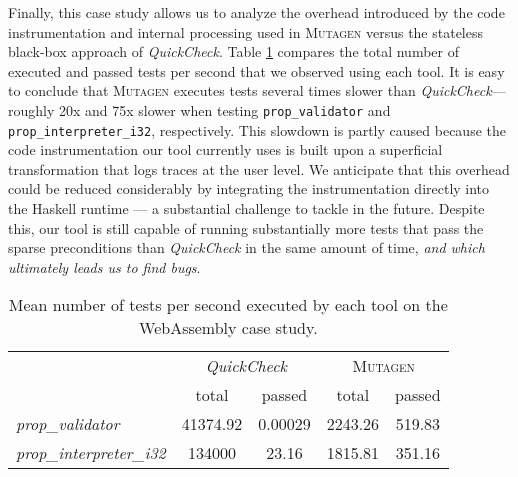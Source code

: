 \documentclass[sigconf, anonymous, review]{acmart}
\newcommand{\quickcheck}{\textit{QuickCheck}\xspace}
\newcommand{\mutagen}{\textsc{Mutagen}\xspace}
\begin{document}
Finally, this case study allows us to analyze the overhead introduced by the
code instrumentation and internal processing used in \mutagen versus the
stateless black-box approach of \quickcheck.
%
Table \ref{table:wasm:overhead} compares the total number of executed and passed
tests per second that we observed using each tool.
%
It is easy to conclude that \mutagen executes tests several times slower than
\quickcheck --- roughly 20x and 75x slower when testing \texttt{prop\_validator}
and \texttt{prop\_interpreter\_i32}, respectively.
%
This slowdown is partly caused because the code instrumentation our tool
currently uses is built upon a superficial transformation that logs traces at
the user level.
%
We anticipate that this overhead could be reduced considerably by integrating
the instrumentation directly into the Haskell runtime --- a substantial
challenge to tackle in the future.
%
Despite this, our tool is still capable of running substantially more tests that
pass the sparse preconditions than \quickcheck in the same amount of time,
\emph{and which ultimately leads us to find bugs}.

\begin{table}
\footnotesize
\begin{tabular}{|l|c|c|c|c|}
\hline
\multicolumn{1}{|c|}{
  \multirow{2}{*}{Property}}
  & \multicolumn{2}{c|}{\quickcheck}
  & \multicolumn{2}{c|}{\mutagen} \\
  \cline{2-5}
  \multicolumn{1}{|c|}{}
  & \multicolumn{1}{c|}{total}
  & passed
  & \multicolumn{1}{c|}{total}
  & passed \\
\hline
\textit{prop\_validator}
& 41374.92
& 0.00029
& 2243.26
& 519.83\\
\hline
\textit{prop\_interpreter\_i32}
& 134000
& 23.16
& 1815.81
& 351.16 \\
\hline
\end{tabular}
\caption{\label{table:wasm:overhead}Mean number of tests per second executed by
  each tool on the WebAssembly case study.}
\end{table}



\end{document}
